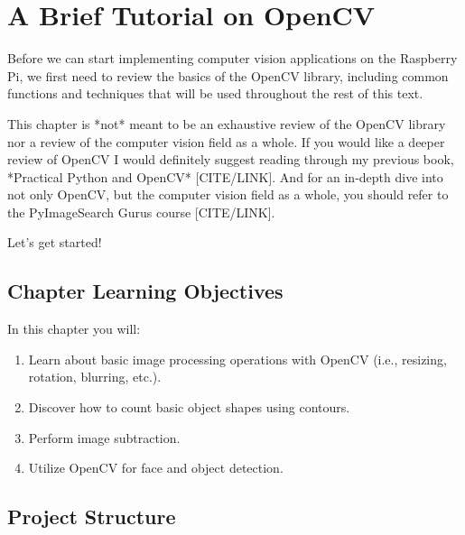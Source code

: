 \chapter{A Brief Tutorial on OpenCV}\label{ch:hobbyist:opencv_basics}

Before we can start implementing computer vision applications on the Raspberry Pi, we first need to review the basics of the OpenCV library, including common functions and techniques that will be used throughout the rest of this text.

This chapter is *not* meant to be an exhaustive review of the OpenCV library nor a review of the computer vision field as a whole. If you would like a deeper review of OpenCV I would definitely suggest reading through my previous book, *Practical Python and OpenCV* [CITE/LINK]. And for an in-depth dive into not only OpenCV, but the computer vision field as a whole, you should refer to the PyImageSearch Gurus course [CITE/LINK].

Let’s get started!


\section{Chapter Learning Objectives}

In this chapter you will:

\begin{enumerate}
    \item Learn about basic image processing operations with OpenCV (i.e., resizing, rotation, blurring, etc.).
    \item Discover how to count basic object shapes using contours.
    \item Perform image subtraction.
    \item Utilize OpenCV for face and object detection.
\end{enumerate}

\section{Project Structure}

